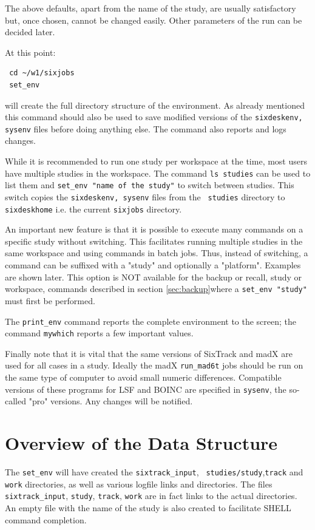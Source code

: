 \documentclass{cernatsnote}
\begin{document}
The above defaults, apart from the name of the study, are usually satisfactory
but, once chosen, cannot be changed easily. Other parameters of the run can be
decided later.

At this point:
\begin{verbatim}
 cd ~/w1/sixjobs
 set_env
\end{verbatim}
will create the full directory structure of the environment.  As already
mentioned this command should also be used to save modified versions of the
{\tt sixdeskenv, sysenv} files before doing anything else. The command also
reports and logs changes.

While it is recommended to run one study per workspace at the time, most users
have multiple studies in the workspace. The command {\tt ls studies} can be
used to list them and {\tt set\_env "name of the study"} to switch between
studies.  This switch copies the {\tt sixdeskenv, sysenv} files from the {\tt
studies} directory to {\tt sixdeskhome} i.e. the current {\tt sixjobs}
directory.

An important new feature is that it is possible to execute many commands on a
specific study without switching. This facilitates running multiple studies in
the same workspace and using commands in batch jobs.  Thus, instead of
switching, a command can be suffixed with a "study" and optionally a
"platform". Examples are shown later.  This option is NOT available for the
backup or recall, study or workspace, commands described in section
\ref{sec:backup}where a {\tt set\_env "study"} must first be performed.

The {\tt print\_env} command reports the complete environment to the screen;
the command {\tt mywhich} reports a few important values.

Finally note that it is vital that the same versions of SixTrack and madX are
used for all cases in a study. Ideally the madX {\tt run\_mad6t} jobs should
be run on the same type of computer to avoid small numeric differences.
Compatible versions of these programs for LSF and BOINC are specified
in {\tt sysenv}, the so-called "pro" versions. Any changes will be notified.

\section{Overview of the Data Structure}

The {\tt set\_env} will have created the {\tt sixtrack\_input}, {\tt
studies/study},{\tt track} and {\tt work} directories, as well as various
logfile links and directories.  The files {\tt sixtrack\_input}, {\tt study},
{\tt track}, {\tt work} are in fact links to the actual directories. An empty
file with the name of the study is also created to facilitate SHELL command
completion.
\end{document}
